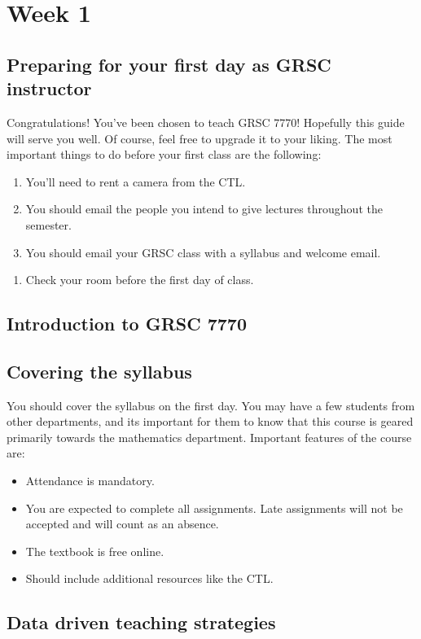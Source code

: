 \section{Week 1}
\label{sec:week-1}

\subsection{Preparing for your first day as GRSC instructor}
\label{sec:preparing-your-first}

Congratulations!  You've been chosen to teach GRSC 7770!  Hopefully this guide will serve you well.  Of course, feel free to upgrade it to your liking.  The most important things to do before your first class are the following:

\begin{enumerate}
\item You'll need to rent a camera from the CTL.
\item You should email the people you intend to give lectures throughout the semester.
\item You should email your GRSC class with a syllabus and welcome email.  
\end{enumerate}

\begin{enumerate}
\item Check your room before the first day of class.  
\end{enumerate}

\subsection{Introduction to GRSC 7770}
\label{sec:intr-grsc-7770}

\subsection{Covering the syllabus}
\label{sec:covering-syllabus}

You should cover the syllabus on the first day.  You may have a few students from other departments, and its important for them to know that this course is geared primarily towards the mathematics department.  Important features of the course are:

\begin{itemize}
\item Attendance is mandatory.
\item You are expected to complete all assignments.  Late assignments will not be accepted and will count as an absence.
\item The textbook is free online.
\item Should include additional resources like the CTL.
\end{itemize}

\subsection{Data driven teaching strategies}
\label{sec:data-driven-teaching} 



